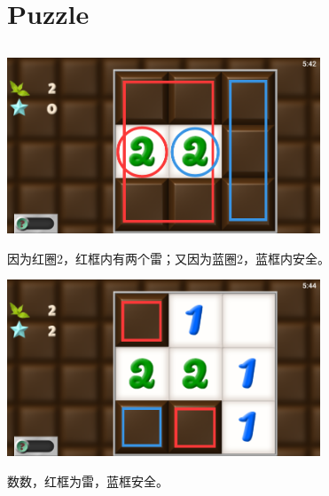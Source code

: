 \section{Puzzle}
\subsection{} %
\begin{center}
    \includegraphics[width=0.7\textwidth]{puzzle/1-1.png}
\end{center}
因为红圈2，红框内有两个雷；又因为蓝圈2，蓝框内安全。
\begin{center}
    \includegraphics[width=0.7\textwidth]{puzzle/1-2.png}
\end{center}
数数，红框为雷，蓝框安全。

